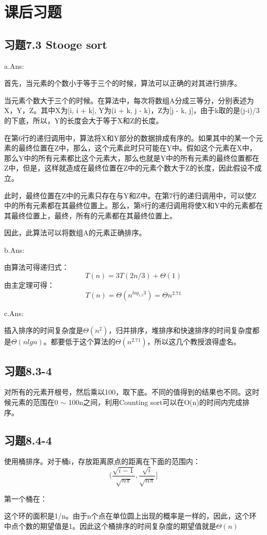 \documentclass[a4paper, 11pt]{article}
\begin{document}
\section{课后习题}
\subsection{习题7.3 Stooge sort}
a.Ans:

首先，当元素的个数小于等于三个的时候，算法可以正确的对其进行排序。

当元素个数大于三个的时候。在算法中，每次将数组A分成三等分，分别表述为X，Y，Z。其中X为[i, i + k], Y为(i + k, j - k)，Z为[j - k, j]，由于k取的是(j-i)/3的下底，所以，Y的长度会大于等于X和Z的长度。

在第6行的递归调用中，算法将X和Y部分的数据排成有序的。如果其中的某一个元素的最终位置在Z中，那么，这个元素此时只可能在Y中。假如这个元素在X中，那么Y中的所有元素都比这个元素大，那么也就是Y中的所有元素的最终位置都在Z中，但是，这样就造成在最终位置在Z中的元素个数大于Z的长度，因此假设不成立。

此时，最终位置在Z中的元素只存在与Y和Z中。在第7行的递归调用中，可以使Z中的所有元素都在其最终位置上。那么，第8行的递归调用将使X和Y中的元素都在其最终位置上，最终，所有的元素都在其最终位置上。

因此，此算法可以将数组A的元素正确排序。

b.Ans:

由算法可得递归式：
\begin{displaymath}
	T(n) = 3T(2n/3)+\Theta(1)
\end{displaymath}
由主定理可得：
\begin{displaymath}
	T(n) = \Theta(n ^ {log_{1.5}{3}}) = \Theta{n^{2.71}}
\end{displaymath}

c.Ans:

插入排序的时间复杂度是$\Theta(n^2)$，归并排序，堆排序和快速排序的时间复杂度都是$\Theta(nlgn)$。都要低于这个算法的$\Theta(n^{2.71})$，所以这几个教授浪得虚名。

\subsection{习题8.3-4}

对所有的元素开根号，然后乘以100，取下底。不同的值得到的结果也不同。这时候元素的范围在0 $\sim$ 100n之间，利用Counting sort可以在O(n)的时间内完成排序。

\subsection{习题8.4-4}

使用桶排序。对于桶i，存放距离原点的距离在下面的范围内：
\begin{displaymath}
	(\frac{\sqrt{i - 1}}{\sqrt{n\pi}}, \frac{\sqrt{i}}{\sqrt{n\pi}}]
\end{displaymath}

第一个桶在：
\begin{displaymath}
	[0, \frac{\sqrt{1}}{\sqrt{n\pi}}]
\end{displaymath}

这个环的面积是1/n。由于n个点在单位圆上出现的概率是一样的，因此，这个环中点个数的期望值是1。因此这个桶排序的时间复杂度的期望值就是$\Theta(n)$
\end{document}
